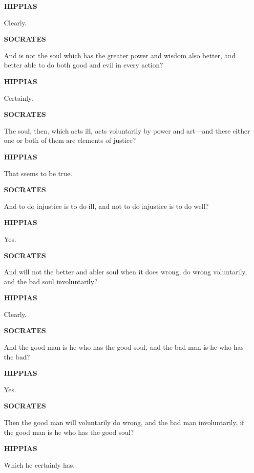 \documentclass[11pt,letter]{article}
\begin{document}
\par \textbf{HIPPIAS}
\par   Clearly.

\par \textbf{SOCRATES}
\par   And is not the soul which has the greater power and wisdom also better, and better able to do both good and evil in every action?

\par \textbf{HIPPIAS}
\par   Certainly.

\par \textbf{SOCRATES}
\par   The soul, then, which acts ill, acts voluntarily by power and art—and these either one or both of them are elements of justice?

\par \textbf{HIPPIAS}
\par   That seems to be true.

\par \textbf{SOCRATES}
\par   And to do injustice is to do ill, and not to do injustice is to do well?

\par \textbf{HIPPIAS}
\par   Yes.

\par \textbf{SOCRATES}
\par   And will not the better and abler soul when it does wrong, do wrong voluntarily, and the bad soul involuntarily?

\par \textbf{HIPPIAS}
\par   Clearly.

\par \textbf{SOCRATES}
\par   And the good man is he who has the good soul, and the bad man is he who has the bad?

\par \textbf{HIPPIAS}
\par   Yes.

\par \textbf{SOCRATES}
\par   Then the good man will voluntarily do wrong, and the bad man involuntarily, if the good man is he who has the good soul?

\par \textbf{HIPPIAS}
\par   Which he certainly has.
\end{document}
